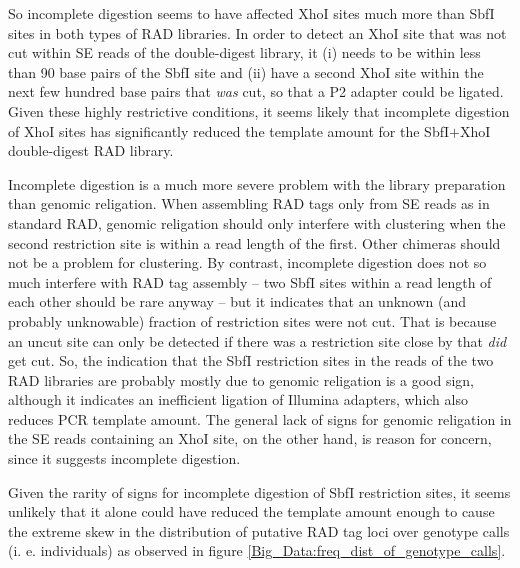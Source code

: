 \documentclass[a4paper,12pt,times,authoryear,twoside,print,index]{Classes/PhDThesisPSnPDF}\usepackage[]{graphicx}\usepackage[]{color}
\begin{document}
So incomplete digestion seems to have affected XhoI sites much more than SbfI sites in both types of RAD libraries. 
In order to detect an XhoI site that was not cut within SE reads of the double-digest library, it (i) needs to be within less than 90 base pairs of the SbfI site and (ii) have a second XhoI site within the next few hundred base pairs that \emph{was} cut, so that a P2 adapter could be ligated. Given these highly restrictive conditions, it seems likely that incomplete digestion of XhoI sites has significantly reduced the template amount for the SbfI$+$XhoI double-digest RAD library.

Incomplete digestion is a much more severe problem with the library preparation than genomic religation. When assembling \glspl{RAD tag} only from SE reads as in standard RAD, genomic religation should only interfere with clustering when the second restriction site is within a read length of the first. Other chimeras should not be a problem for clustering. By contrast, incomplete digestion does not so much interfere with \gls{RAD tag} assembly -- two SbfI sites within a read length of each other should be rare anyway -- but it indicates that an unknown (and probably unknowable) fraction of restriction sites were not cut. That is because an uncut site can only be detected if there was a restriction site close by that \emph{did} get cut. So, the indication that the SbfI restriction sites in the reads of the two RAD libraries are probably mostly due to genomic religation is a good sign, although it indicates an inefficient ligation of Illumina adapters, which also reduces PCR template amount. The general lack of signs for genomic religation in the SE reads containing an XhoI site, on the other hand, is reason for concern, since it suggests incomplete digestion. 

Given the rarity of signs for incomplete digestion of SbfI restriction sites, it seems unlikely that it alone could have reduced the template amount enough to cause the extreme skew in the distribution of putative \gls{RAD tag} loci over genotype calls (i. e. individuals) as observed in figure \ref{Big_Data:freq_dist_of_genotype_calls}.
\end{document}
